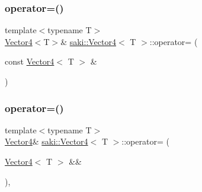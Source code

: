\mbox{\label{classsaki_1_1_vector4_a21105aa4ba724daa7c1ab708083f996b}} 
\subsubsection{\texorpdfstring{operator=()}{operator=()}\hspace{0.1cm}{\footnotesize\ttfamily [1/2]}}
{\footnotesize\ttfamily template$<$typename T$>$ \\
\mbox{\hyperlink{classsaki_1_1_vector4}{Vector4}}$<$T$>$\& \mbox{\hyperlink{classsaki_1_1_vector4}{saki\+::\+Vector4}}$<$ T $>$\+::operator= (\begin{DoxyParamCaption}\item[{const \mbox{\hyperlink{classsaki_1_1_vector4}{Vector4}}$<$ T $>$ \&}]{ }\end{DoxyParamCaption})\hspace{0.3cm}{\ttfamily [default]}}

\mbox{\label{classsaki_1_1_vector4_ae4f87b2ce6009fc590ef51736c518e4d}} 
\subsubsection{\texorpdfstring{operator=()}{operator=()}\hspace{0.1cm}{\footnotesize\ttfamily [2/2]}}
{\footnotesize\ttfamily template$<$typename T$>$ \\
\mbox{\hyperlink{classsaki_1_1_vector4}{Vector4}}\& \mbox{\hyperlink{classsaki_1_1_vector4}{saki\+::\+Vector4}}$<$ T $>$\+::operator= (\begin{DoxyParamCaption}\item[{\mbox{\hyperlink{classsaki_1_1_vector4}{Vector4}}$<$ T $>$ \&\&}]{ }\end{DoxyParamCaption})\hspace{0.3cm}{\ttfamily [default]}, {\ttfamily [noexcept]}}

\mbox{\label{classsaki_1_1_vector4_ac024e2c73933fa64a5e8dccf237bb049}} 
